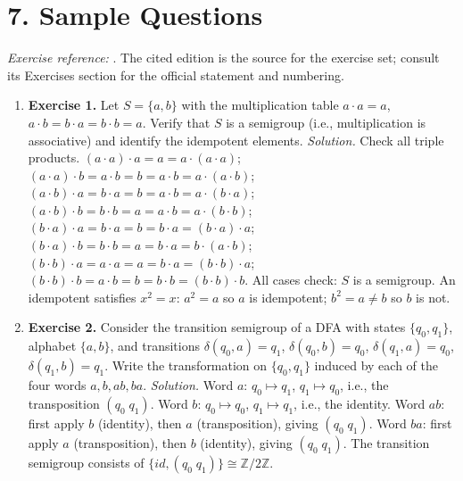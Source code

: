 \section*{7. Sample Questions}
\emph{Exercise reference:} \cite{semigroup_ref1}. The cited edition is the source for the exercise set; consult its Exercises section for the official statement and numbering.
\begin{enumerate}[leftmargin=*,itemsep=0.9em]
\item \textbf{Exercise 1.} Let $S=\{a,b\}$ with the multiplication table $a\cdot a=a$, $a\cdot b=b\cdot a=b\cdot b=a$. Verify that $S$ is a semigroup (i.e., multiplication is associative) and identify the idempotent elements. \emph{Solution.} Check all triple products. $(a\cdot a)\cdot a=a=a\cdot(a\cdot a)$; $(a\cdot a)\cdot b=a\cdot b=b=a\cdot b=a\cdot(a\cdot b)$; $(a\cdot b)\cdot a=b\cdot a=b=a\cdot b=a\cdot(b\cdot a)$; $(a\cdot b)\cdot b=b\cdot b=a=a\cdot b=a\cdot(b\cdot b)$; $(b\cdot a)\cdot a=b\cdot a=b=b\cdot a=(b\cdot a)\cdot a$; $(b\cdot a)\cdot b=b\cdot b=a=b\cdot a=b\cdot(a\cdot b)$; $(b\cdot b)\cdot a=a\cdot a=a=b\cdot a=(b\cdot b)\cdot a$; $(b\cdot b)\cdot b=a\cdot b=b=b\cdot b=(b\cdot b)\cdot b$. All cases check: $S$ is a semigroup. An idempotent satisfies $x^2=x$: $a^2=a$ so $a$ is idempotent; $b^2=a\ne b$ so $b$ is not.

\item \textbf{Exercise 2.} Consider the transition semigroup of a DFA with states $\{q_0,q_1\}$, alphabet $\{a,b\}$, and transitions $\delta(q_0,a)=q_1$, $\delta(q_0,b)=q_0$, $\delta(q_1,a)=q_0$, $\delta(q_1,b)=q_1$. Write the transformation on $\{q_0,q_1\}$ induced by each of the four words $a,b,ab,ba$. \emph{Solution.} Word $a$: $q_0\mapsto q_1$, $q_1\mapsto q_0$, i.e., the transposition $(q_0\;q_1)$. Word $b$: $q_0\mapsto q_0$, $q_1\mapsto q_1$, i.e., the identity. Word $ab$: first apply $b$ (identity), then $a$ (transposition), giving $(q_0\;q_1)$. Word $ba$: first apply $a$ (transposition), then $b$ (identity), giving $(q_0\;q_1)$. The transition semigroup consists of $\{id,(q_0\;q_1)\}\cong\mathbb{Z}/2\mathbb{Z}$.


\end{enumerate}
